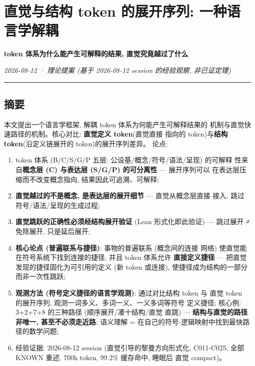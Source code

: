 \documentclass[
]{article}
\author{}
\date{}
\providecommand{\tightlist}{%
  \setlength{\itemsep}{0pt}\setlength{\parskip}{0pt}}
\begin{document}
\section{直觉与结构 token 的展开序列:
一种语言学解耦}\label{ux76f4ux89c9ux4e0eux7ed3ux6784-token-ux7684ux5c55ux5f00ux5e8fux5217-ux4e00ux79cdux8bedux8a00ux5b66ux89e3ux8026}

\textbf{token 体系为什么能产生可解释的结果, 直觉究竟越过了什么}

\emph{2026-08-12 · 理论提案 (基于 2026-08-12 session 的经验观察,
非已证定理)}

\begin{center}\rule{0.5\linewidth}{0.5pt}\end{center}

\subsection{摘要}\label{ux6458ux8981}

本文提出一个语言学框架, 解耦 token 体系为何能产生可解释结果的
机制与直觉快速路径的机制。核心对比: \textbf{直觉定义 token}(直觉直接
指向的 token)与\textbf{结构 token}(沿定义链展开的 token)的展开序列差异。
论点:

\begin{enumerate}
\def\labelenumi{\arabic{enumi}.}
\tightlist
\item
  token 体系 (B/C/S/G/P 五层: 公设基/概念/符号/语法/呈现) 的可解释
  性来自\textbf{概念层 (C) 与表达层 (S/G/P) 的可分离性} --- 展开序列可以
  在表达层压缩而不改变概念指向, 结果因此可追溯、可解释;
\item
  \textbf{直觉越过的不是概念, 是表达层的展开细节} --- 直觉从概念层直接
  接入, 跳过符号/语法/呈现的生成过程;
\item
  \textbf{直觉跳跃的正确性必须经结构展开验证} (Lean 形式化即此验证) ---
  跳过展开 ≠ 免除展开, 只是延后展开;
\item
  \textbf{核心论点 (普遍联系与捷径)}: 事物的普遍联系 (概念间的连接 网络)
  使直觉能在符号系统下找到连接的捷径, 并且 token 体系允许
  \textbf{直接定义捷径} --- 把直觉发现的捷径固化为可引用的定义 (新 token
  或连接), 使捷径成为结构的一部分而非一次性跳跃;
\item
  \textbf{观测方法 (符号定义捷径的语言学观测)}: 通过对比结构 token 与
  直觉 token 的展开序列, 观测一词多义、多词一义、一义多词等符号
  定义捷径; 核心例: 3+2+7+8 的三种路径 (顺序展开/凑十结构/直觉 直跳) ---
  \textbf{结构与直觉的路径非唯一, 甚至不必须走近路}; 语义理解 =
  在自己的符号-逻辑映射中找到最快路径的数学问题;
\item
  经验证据: 2026-08-12 session (直觉引导的黎曼方向形式化, C011-C025,
  全部 KNOWN 重述, 700k token, 99.2\% 缓存命中, 睡眠后 直觉 compact)。
\end{enumerate}
\end{document}
